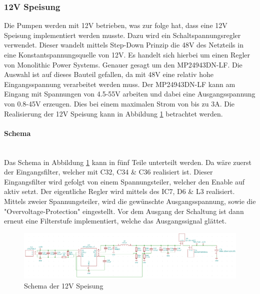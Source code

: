 \subsubsection{12V Speisung}
\label{subsubsec:12V Speisung}

Die Pumpen werden mit 12V betrieben, was zur folge hat, dass eine 12V Speisung implementiert werden musste. Dazu wird ein Schaltspannungsregler verwendet. Dieser wandelt mittels Step-Down Prinzip die 48V des Netzteils in eine Konstantspannungsquelle von 12V. Es handelt sich hierbei um einen Regler von Monolithic Power Systems. Genauer gesagt um den MP24943DN-LF. Die Auswahl ist auf dieses Bauteil gefallen, da mit 48V eine relativ hohe Eingangsspannung verarbeitet werden muss. Der MP24943DN-LF kann am Eingang mit Spannungen von 4.5-55V arbeiten und dabei eine Ausgangsspannung von 0.8-45V erzeugen. Dies bei einem maximalen Strom von bis zu 3A. Die Realisierung der 12V Speisung kann in Abbildung \ref{fig:Schema_Speisung_12V} betrachtet werden.\\

\paragraph{Schema}\mbox{}\\

Das Schema in Abbildung \ref{fig:Schema_Speisung_12V} kann in fünf Teile unterteilt werden. Da wäre zuerst der Eingangsfilter, welcher mit C32, C34 \& C36 realisiert ist. Dieser Eingangsfilter wird gefolgt von einem Spannungsteiler, welcher den Enable auf aktiv setzt. Der eigentliche Regler wird mittels des IC7, D6 \& L3 realisiert. Mittels zweier Spannungsteiler, wird die gewünschte Ausgangsspannung, sowie die "Overvoltage-Protection" eingestellt. Vor dem Ausgang der Schaltung ist dann erneut eine Filterstufe implementiert, welche das Ausgangssignal glättet.

\begin{figure}[h!]
	\centering
	\includegraphics[width=\textwidth]{graphics/Schema_Speisung_12V.png}
	\caption{Schema der 12V Speisung}
	\label{fig:Schema_Speisung_12V}
\end{figure} 

